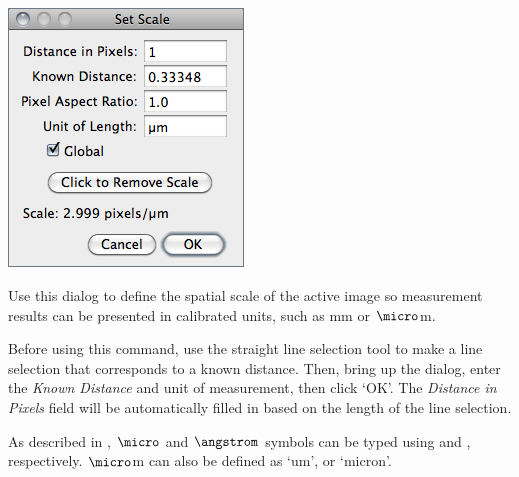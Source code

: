 \subsection{\protect{}\label{sub:Set-Scale...}}

\begin{minipage}[c][1\totalheight][t]{0.345\columnwidth}%
\includegraphics[scale=0.55]{images/SetScale}%
\end{minipage}%
\begin{minipage}[c][1\totalheight][t]{0.655\columnwidth}%
Use this dialog to define the spatial scale of the active image so
measurement results can be presented in calibrated units, such as
mm or $\micro$m.\medskip{}


Before using this command, use the straight line selection tool to
make a line selection that corresponds to a known distance. Then,
bring up the  dialog, enter
the \emph{Known Distance} and unit of measurement, then click `OK'.
The \emph{Distance in Pixels} field will be automatically filled in
based on the length of the line selection.

\medskip{}


As described in ,
$\micro$ and $\angstrom$ symbols can be typed using 
and , respectively.
$\micro$m can also be defined as `um', or `micron'.%
\end{minipage}


